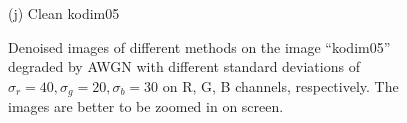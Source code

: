 \documentclass[10pt,onecolumn,letterpaper]{article}
\begin{document}
\begin{figure}
{\begin{minipage}[t]{0.195\textwidth}
{\footnotesize (j) Clean kodim05}
\end{minipage}
}
\caption{Denoised images of different methods on the image ``kodim05'' degraded by AWGN with different standard deviations of $\sigma_{r}=40, \sigma_{g}=20, \sigma_{b}=30$ on R, G, B channels, respectively. The images are better to be zoomed in on screen.}
\label{f1}
\vspace{2mm}
\end{figure}

\begin{figure}\vspace{1mm}
\centering
{}
\end{figure}
\end{document}
